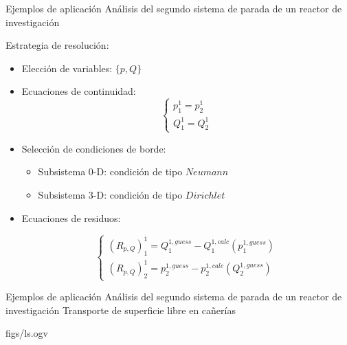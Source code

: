 \normalsize
\begin{frame}
{Ejemplos de aplicación}
{Análisis del segundo sistema de parada de un reactor de investigación}

Estrategia de resolución: 
\begin{itemize}
\item Elección de variables: $\{p,Q\}$
\item <2->Ecuaciones de continuidad:
\begin{equation*}
\left\{ \begin{array}{l}
p_1^1 = p_2^1 \\
Q_1^1 = Q_2^1
\end{array}
\right.
\end{equation*}
\item <3-> Selección de condiciones de borde:
    \begin{itemize}
    \item Subsistema 0-D: condición de tipo $Neumann$
    \item Subsistema 3-D: condición de tipo $Dirichlet$
    \end{itemize}
\item <4-> Ecuaciones de residuos:

\begin{equation*}
\left\{ \begin{array}{l}
(R_{p,Q})_{1}^{1} =Q_1^{1,guess} - Q_1^{1,calc}(p_1^{1,guess}) \\
(R_{p,Q})_{2}^{1} =p_2^{1,guess} - p_2^{1,calc}(Q_2^{1,guess})
\end{array}
\right.
\end{equation*}

\end{itemize}

\end{frame}


\begin{frame}
{Ejemplos de aplicación}
{Análisis del segundo sistema de parada de un reactor de investigación}
Transporte de superficie libre en cañerías
\begin{center}
%
{figs/ls.ogv} %
\end{center}
\end{frame}


